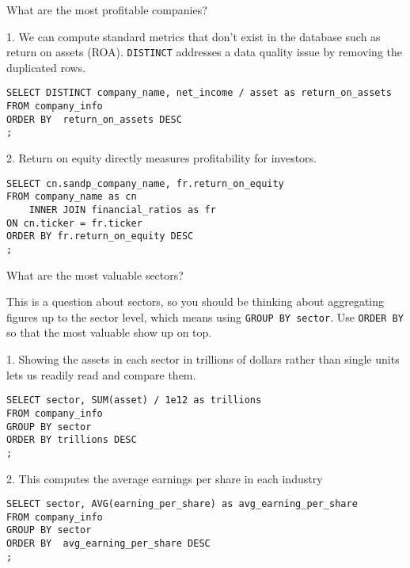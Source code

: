\documentclass[10pt]{exam}
\begin{document}
\begin{questions}

\question What are the most profitable companies?

\begin{solution}

1. We can compute standard metrics that don't exist in the database such as
return on assets (ROA).
\texttt{DISTINCT} addresses a data quality issue by removing the duplicated
    rows.

\begin{lstlisting}
SELECT DISTINCT company_name, net_income / asset as return_on_assets
FROM company_info
ORDER BY  return_on_assets DESC
;
\end{lstlisting}

2.
Return on equity directly measures profitability for investors.

\begin{lstlisting}
SELECT cn.sandp_company_name, fr.return_on_equity
FROM company_name as cn
    INNER JOIN financial_ratios as fr
ON cn.ticker = fr.ticker
ORDER BY fr.return_on_equity DESC
;
\end{lstlisting}

\end{solution}


\question What are the most valuable sectors?

\begin{solution}
    This is a question about sectors, so you should be thinking about
    aggregating figures up to the sector level, which means using \texttt{GROUP
    BY sector}. Use \texttt{ORDER BY} so that the most valuable show up on
    top.

1.    Showing the assets in each sector in trillions of dollars rather than single units lets us
    readily read and compare them.

\begin{lstlisting}
SELECT sector, SUM(asset) / 1e12 as trillions
FROM company_info
GROUP BY sector
ORDER BY trillions DESC
;
\end{lstlisting}

2. This computes the average earnings per share in each industry

\begin{lstlisting}
SELECT sector, AVG(earning_per_share) as avg_earning_per_share
FROM company_info
GROUP BY sector
ORDER BY  avg_earning_per_share DESC
;
\end{lstlisting}
\end{solution}


\end{questions}
\end{document}
